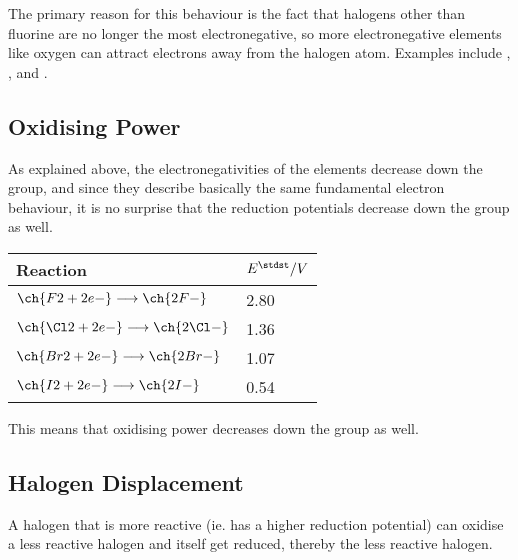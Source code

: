 			The primary reason for this behaviour is the fact that halogens other than fluorine are no longer the most electronegative, so more
			electronegative elements like oxygen can attract electrons away from the halogen atom. Examples include , , and
			.



		\subsection{Oxidising Power}

			As explained above, the electronegativities of the elements decrease down the group, and since they describe basically the same
			fundamental electron behaviour, it is no surprise that the reduction potentials decrease down the group as well.

			\begin{table}[htb]\renewcommand{\arraystretch}{1.5}\begin{center}
			\begin{tabu} to 0.6\textwidth {X[c,m] | X[c,m]}

				Reaction                                        &   $E^{\stdst} / V$                    \\  \hline
				$\ch{F2 + 2 e-} \longrightarrow \ch{2 F-}$      &   \num[retain-explicit-plus]{+2.80}   \\
				$\ch{\Cl2 + 2 e-} \longrightarrow \ch{2 \Cl-}$  &   \num[retain-explicit-plus]{+1.36}   \\
				$\ch{Br2 + 2 e-} \longrightarrow \ch{2 Br-}$    &   \num[retain-explicit-plus]{+1.07}   \\
				$\ch{I2 + 2 e-} \longrightarrow \ch{2 I-}$      &   \num[retain-explicit-plus]{+0.54}   \\

			\end{tabu}\end{center}
			\end{table}\vspace{-1em}

			This means that oxidising power decreases down the group as well.



		\subsection{Halogen Displacement}

			A halogen that is more reactive (ie. has a higher reduction potential) can oxidise a less reactive halogen and itself get reduced,
			thereby  the less reactive halogen.


